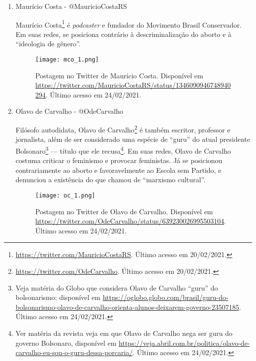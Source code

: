 \documentclass[
	12pt,				%
	openright,			%
	twoside,			%
	a4paper,			%
	english,			%
	brazil				%
	]{abntex2}
\begin{document}
\begin{anexosenv}
\begin{enumerate}
 \begin{figure}[!htbp]
    \centering
    \texttt{[image: mlo\_3.png]}
    \caption{Postagem no Twitter de MARISA LOBO-Supl.Dep.Federal. Disponível em \url{https://twitter.com/marisa_lobo/status/282478911890288640}. Último acesso em 24/02/2021.}
 \end{figure}
 
 \newpage
 
 \item Maurício Costa - @MauricioCostaRS
 
 Maurício Costa\footnote{\url{https://twitter.com/MauricioCostaRS}. Último acesso em 20/02/2021.} é \textit{podcaster} e fundador do Movimento Brasil Conservador. Em suas redes, se posiciona contrário à descriminalização do aborto e à ``ideologia de gênero''.
 
 \begin{figure}[!htbp]
    \centering
    \texttt{[image: mco\_1.png]}
    \caption{Postagem no Twitter de Maurício Costa. Disponível em \url{https://twitter.com/MauricioCostaRS/status/1346090946748940294}. Último acesso em 24/02/2021.}
 \end{figure}
 
  \newpage
  
 \item Olavo de Carvalho - @OdeCarvalho
 
 Filósofo autodidata, Olavo de Carvalho\footnote{\url{https://twitter.com/OdeCarvalho}. Último acesso em 20/02/2021.} é também escritor, professor e jornalista, além de ser considerado uma espécie de ``guru'' do atual presidente Bolsonaro\footnote{Veja matéria do Globo que considera Olavo de Carvalho ``guru'' do bolsonarismo; disponível em \url{https://oglobo.globo.com/brasil/guru-do-bolsonarismo-olavo-de-carvalho-orienta-alunos-deixarem-governo-23507185}. Último acesso em 24/02/2021.} --- título que ele recusa\footnote{Ver matéria da revista veja em que Olavo de Carvalho nega ser guru do governo Bolsonaro, disponível em \url{https://veja.abril.com.br/politica/olavo-de-carvalho-eu-sou-o-guru-dessa-porcaria/}. Último acesso em 24/02/2021.}. Em suas redes, Olavo de Carvalho costuma criticar o feminismo e provocar feministas. Já se posicionou contrariamente ao aborto e favoravelmente ao Escola sem Partido, e denunciou a existência do que chamou de ``marxismo cultural''.
 
 \begin{figure}[!htbp]
    \centering
    \texttt{[image: oc\_1.png]}
    \caption{Postagem no Twitter de Olavo de Carvalho. Disponível em \url{https://twitter.com/OdeCarvalho/status/639230026995503104}. Último acesso em 24/02/2021.}
 \end{figure}
 

\end{enumerate}
\end{anexosenv}
\end{document}
